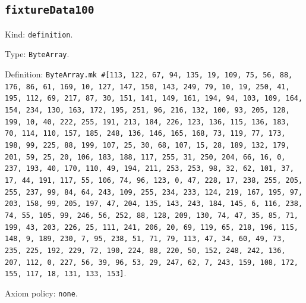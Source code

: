 \documentclass[11pt]{article}
\begin{document}
\subsection*{\texttt{fixtureData100}}
\noindent Kind: \texttt{definition}.\par
\noindent Type: \texttt{ByteArray}.\par
\noindent Definition: \texttt{ByteArray.mk \#[113, 122, 67, 94, 135, 19, 109, 75, 56, 88, 176, 86, 61, 169, 10, 127, 147, 150, 143, 249, 79, 10, 19, 250, 41, 195, 112, 69, 217, 87, 30, 151, 141, 149, 161, 194, 94, 103, 109, 164, 154, 234, 130, 163, 172, 195, 251, 96, 216, 132, 100, 93, 205, 128, 199, 10, 40, 222, 255, 191, 213, 184, 226, 123, 136, 115, 136, 183, 70, 114, 110, 157, 185, 248, 136, 146, 165, 168, 73, 119, 77, 173, 198, 99, 225, 88, 199, 107, 25, 30, 68, 107, 15, 28, 189, 132, 179, 201, 59, 25, 20, 106, 183, 188, 117, 255, 31, 250, 204, 66, 16, 0, 237, 193, 40, 170, 110, 49, 194, 211, 253, 253, 98, 32, 62, 101, 37, 17, 44, 191, 117, 55, 106, 74, 96, 123, 0, 47, 228, 17, 238, 255, 205, 255, 237, 99, 84, 64, 243, 109, 255, 234, 233, 124, 219, 167, 195, 97, 203, 158, 99, 205, 197, 47, 204, 135, 143, 243, 184, 145, 6, 116, 238, 74, 55, 105, 99, 246, 56, 252, 88, 128, 209, 130, 74, 47, 35, 85, 71, 199, 43, 203, 226, 25, 111, 241, 206, 20, 69, 119, 65, 218, 196, 115, 148, 9, 189, 230, 7, 95, 238, 51, 71, 79, 113, 47, 34, 60, 49, 73, 235, 225, 192, 229, 72, 190, 224, 88, 220, 50, 152, 248, 242, 136, 207, 112, 0, 227, 56, 39, 96, 53, 29, 247, 62, 7, 243, 159, 108, 172, 155, 117, 18, 131, 133, 153]}.\par
\noindent Axiom policy: \texttt{none}.\par
\end{document}
